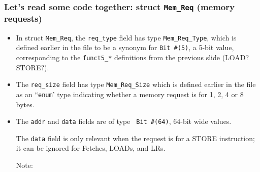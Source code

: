 
\begin{frame}[fragile]
\frametitle{Let's read some code together: struct {\tt Mem\_Req} (memory requests)}

\begin{center}\scriptsize


 \vspace*{5ex}

 \begin{minipage}{0.8\textwidth}
  \begin{itemize}

   \item In struct {\tt Mem\_Req}, the {\tt req\_type} field has type
     {\tt Mem\_Req\_Type}, which is defined earlier in the file to be
     a synonym for {\tt Bit~\#(5)}, {\ie} a 5-bit value, corresponding
     to the {\tt funct5\_*} definitions from the previous slide (LOAD?
     STORE?).

   \item The {\tt req\_size} field has type {\tt Mem\_Req\_Size} which
     is defined earlier in the file as an ``{\tt enum}' type
     indicating whether a memory request is for 1, 2, 4 or 8 bytes.

   \item The {\tt addr} and {\tt data} fields are of type {\tt
     Bit~\#{(64)}}, {\ie} 64-bit wide values.

     The {\tt data} field is only relevant when the request is for a
     STORE instruction; it can be ignored for Fetches, LOADs, and LRs.

     Note: 
\end{itemize}
\end{minipage}
\end{center}
\end{frame}
